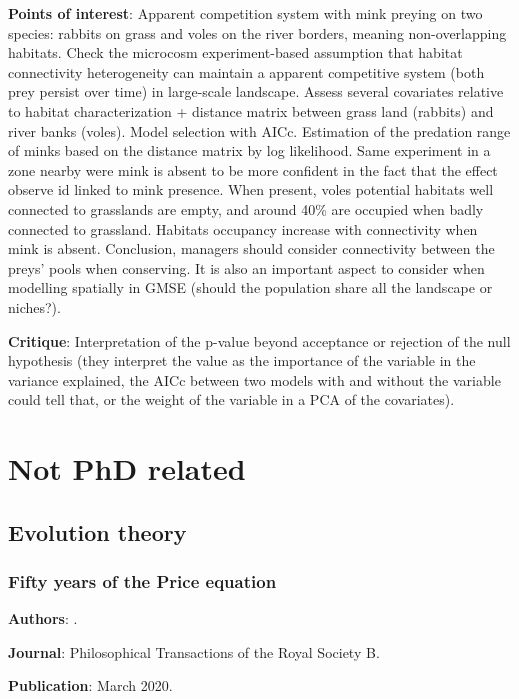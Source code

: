 \documentclass[12pt,a4paper]{article}
\begin{document}
\textbf{Points of interest}: Apparent competition system with mink preying on two species: rabbits on grass and voles on the river borders, meaning non-overlapping habitats. Check the microcosm experiment-based assumption that habitat connectivity heterogeneity can maintain a apparent competitive system (both prey persist over time) in large-scale landscape. Assess several covariates relative to habitat characterization + distance matrix between grass land (rabbits) and river banks (voles). Model selection with AICc. Estimation of the predation range of minks based on the distance matrix by log likelihood. Same experiment in a zone nearby were mink is absent to be more confident in the fact that the effect observe id linked to mink presence. When present, voles potential habitats well connected to grasslands are empty, and around 40\% are occupied when badly connected to grassland. Habitats occupancy increase with connectivity when mink is absent. Conclusion, managers should consider connectivity between the preys' pools when conserving. It is also an important aspect to consider when modelling spatially in GMSE (should the population share all the landscape or niches?).

\textbf{Critique}: Interpretation of the p-value beyond acceptance or rejection of the null hypothesis (they interpret the value as the importance of the variable in the variance explained, the AICc between two models with and without the variable could tell that, or the weight of the variable in a PCA of the covariates).

\newpage

\section*{Not PhD related}

\subsection*{Evolution theory}

\subsubsection*{Fifty years of the Price equation}

\textbf{Authors}: \cite{lethtonen2020price}.

\textbf{Journal}: Philosophical Transactions of the Royal Society B.

\textbf{Publication}: March 2020.
\end{document}
